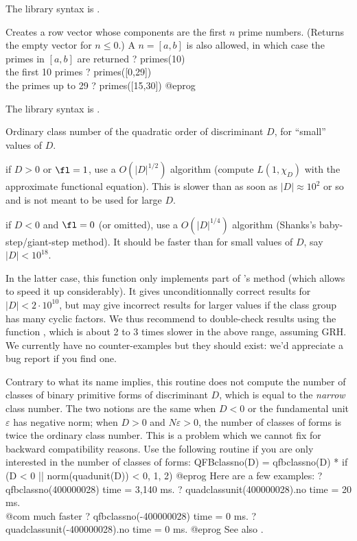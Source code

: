 The library syntax is .

\label{se:primes}
Creates a row vector whose components are the first $n$ prime numbers.
(Returns the empty vector for $n \leq 0$.) A  $n = [a,b]$ is also
allowed, in which case the primes in $[a,b]$ are returned
\bprog
? primes(10)     \\ the first 10 primes
? primes([0,29])  \\ the primes up to 29
? primes([15,30])
@eprog

The library syntax is .

\label{se:qfbclassno}
Ordinary class number of the quadratic order of discriminant $D$, for
``small'' values of $D$.

\item if  $D > 0$ or $\fl = 1$, use a $O(|D|^{1/2})$
algorithm (compute $L(1,\chi_D)$ with the approximate functional equation).
This is slower than  as soon as $|D| \approx 10^2$ or
so and is not meant to be used for large $D$.

\item if $D < 0$ and $\fl = 0$ (or omitted), use a $O(|D|^{1/4})$
algorithm (Shanks's baby-step/giant-step method). It should
be faster than  for small values of $D$, say
$|D| < 10^{18}$.

 In the latter case, this function only
implements part of 's method (which allows to speed it up
considerably). It gives unconditionnally correct results for $|D| < 2\cdot
10^{10}$, but may give incorrect results for larger values if the class
group has many cyclic factors. We thus recommend to double-check results
using the function , which is about 2 to 3 times slower in
the above range, assuming GRH. We currently have no counter-examples but
they should exist: we'd appreciate a bug report if you find one.

 Contrary to what its name implies, this routine does not
compute the number of classes of binary primitive forms of discriminant $D$,
which is equal to the \emph{narrow} class number. The two notions are the same
when $D < 0$ or the fundamental unit $\varepsilon$ has negative norm; when $D
> 0$ and $N\varepsilon > 0$, the number of classes of forms is twice the
ordinary class number. This is a problem which we cannot fix for backward
compatibility reasons. Use the following routine if you are only interested
in the number of classes of forms:
\bprog
QFBclassno(D) =
qfbclassno(D) * if (D < 0 || norm(quadunit(D)) < 0, 1, 2)
@eprog\noindent
Here are a few examples:
\bprog
? qfbclassno(400000028)
time = 3,140 ms.
? quadclassunit(400000028).no
time = 20 ms. \\@com{ much faster}
? qfbclassno(-400000028)
time = 0 ms.
? quadclassunit(-400000028).no
time = 0 ms.
@eprog\noindent
See also .

